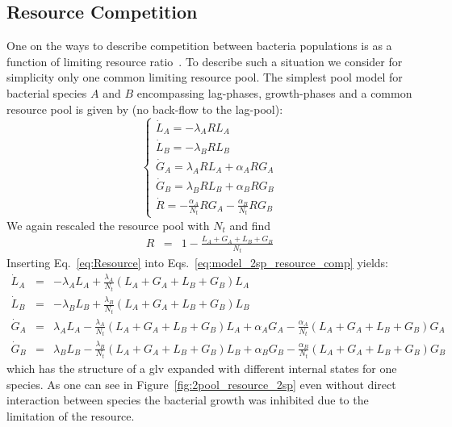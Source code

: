 \documentclass[10pt,A4paper]{article}
\numberwithin{equation}{section}
\begin{document}
\subsection{Resource Competition}
One on the ways to describe competition between bacteria populations is as a function of limiting resource ratio~\cite{tilman_resource_1977, smith_effects_2002}.
To describe such a situation we consider for simplicity only one common limiting resource pool.
The simplest pool model for bacterial species $A$ and $B$ encompassing lag-phases, growth-phases and a common resource pool is given by (no back-flow to the lag-pool):
\begin{equation}
    \begin{cases}
        \dot{L}_A = - \lambda_A R L_A\\
        \dot{L}_B = - \lambda_B R L_B \\
        \dot{G}_A = \lambda_A R L_A +\alpha_A R G_A\\
        \dot{G}_B = \lambda_B R L_B +\alpha_B R G_B\\
        \dot{R} =-\frac{\alpha_A}{N_t} R G_A-\frac{\alpha_B}{N_t} R G_B
    \end{cases}
    \label{eq:model_2sp_resource_comp}
\end{equation}
We again rescaled the resource pool with $N_t$ and find
\begin{eqnarray}
\label{eq:Resource}
R &=&1-\frac{L_A+G_A+L_B+G_B}{N_t}
\end{eqnarray}
Inserting Eq.~\ref{eq:Resource} into Eqs.~\ref{eq:model_2sp_resource_comp} yields:
\begin{eqnarray*}
    \dot{L}_A &=& - \lambda_A  L_A + \frac{\lambda_A}{N_t}\left(L_A+G_A+L_B+G_B\right)L_A\\
    \dot{L}_B &=& - \lambda_B L_B + \frac{\lambda_B}{N_t}\left(L_A+G_A+L_B+G_B\right)L_B \\
    \dot{G}_A &=&  \lambda_A  L_A - \frac{\lambda_A}{N_t}\left(L_A+G_A+L_B+G_B\right)L_A +\alpha_A G_A - \frac{\alpha_A}{N_t}\left(L_A+G_A+L_B+G_B\right)G_A\\
    \dot{G}_B &=&  \lambda_B L_B - \frac{\lambda_B}{N_t}\left(L_A+G_A+L_B+G_B\right)L_B  +\alpha_B G_B -\frac{\alpha_B}{N_t}\left(L_A+G_A+L_B+G_B\right)G_B
\end{eqnarray*}
which has the structure of a \ac{glv} expanded with different internal states for one species.
As one can see in Figure~\ref{fig:2pool_resource_2sp} even without direct interaction between species the bacterial growth was inhibited due to the limitation of the resource.
\end{document}
